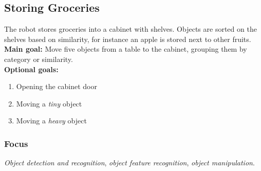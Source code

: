 \subsection{Storing Groceries}
\label{test:storing-groceries}
The robot stores groceries into a cabinet with shelves. Objects are sorted on the shelves based on similarity, for instance an apple is stored next to other fruits.\\

\noindent \textbf{Main goal:} Move five objects from a table to the cabinet, grouping them by category or similarity.\\

\noindent \textbf{Optional goals:}
\begin{enumerate}[nosep]
	\item Opening the cabinet door
	\item Moving a \emph{tiny} object
	\item Moving a \emph{heavy} object
\end{enumerate}

\subsubsection*{Focus}
\emph{Object detection and recognition}, \emph{object feature recognition}, \emph{object manipulation}.

